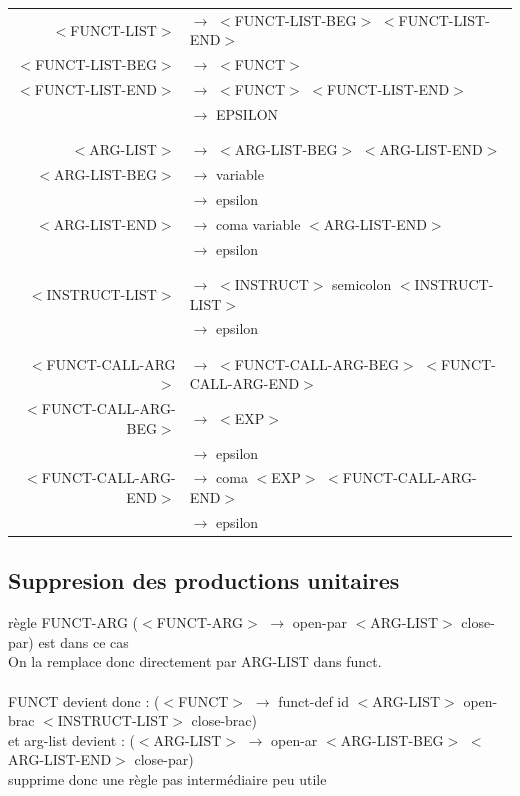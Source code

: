 \documentclass[a4paper,10pt]{article}
\begin{document}
	\begin{center}\begin{tabular}{rl}				
					
		$<$FUNCT-LIST$>$		& $\rightarrow$ $<$FUNCT-LIST-BEG$>$ $<$FUNCT-LIST-END$>$\\
		$<$FUNCT-LIST-BEG$>$	& $\rightarrow$ $<$FUNCT$>$ \\
		$<$FUNCT-LIST-END$>$	& $\rightarrow$ $<$FUNCT$>$ $<$FUNCT-LIST-END$>$\\
								& $\rightarrow$ EPSILON \\
								&\\
								&\\

		$<$ARG-LIST$>$			& $\rightarrow$ $<$ARG-LIST-BEG$>$ $<$ARG-LIST-END$>$\\ 
		$<$ARG-LIST-BEG$>$		& $\rightarrow$ variable\\ 
								& $\rightarrow$ epsilon \\
		$<$ARG-LIST-END$>$		& $\rightarrow$ coma variable $<$ARG-LIST-END$>$\\ 
								& $\rightarrow$ epsilon \\
								&\\
								&\\
		$<$INSTRUCT-LIST$>$		& $\rightarrow$ $<$INSTRUCT$>$ semicolon $<$INSTRUCT-LIST$>$\\
								& $\rightarrow$ epsilon\\
								&\\
								&\\

		$<$FUNCT-CALL-ARG$>$	& $\rightarrow$ $<$FUNCT-CALL-ARG-BEG$>$ $<$FUNCT-CALL-ARG-END$>$\\ 
		$<$FUNCT-CALL-ARG-BEG$>$& $\rightarrow$ $<$EXP$>$\\ 
								& $\rightarrow$ epsilon \\
		$<$FUNCT-CALL-ARG-END$>$& $\rightarrow$ coma $<$EXP$>$ $<$FUNCT-CALL-ARG-END$>$\\ 
								& $\rightarrow$ epsilon \\
	\end{tabular}\end{center}

\subsection{Suppresion des productions unitaires}
	 règle FUNCT-ARG ($<$FUNCT-ARG$>$ $\rightarrow$ open-par $<$ARG-LIST$>$ close-par) est dans ce cas\\
	On la remplace donc directement par ARG-LIST dans funct.\\
	~\\
	FUNCT devient donc : ($<$FUNCT$>$	 $\rightarrow$ funct-def id $<$ARG-LIST$>$ open-brac $<$INSTRUCT-LIST$>$ close-brac) \\
	et arg-list devient : ($<$ARG-LIST$>$  $\rightarrow$ open-ar $<$ARG-LIST-BEG$>$ $<$ARG-LIST-END$>$ close-par)\\
	supprime donc une règle pas intermédiaire peu utile
\end{document}
